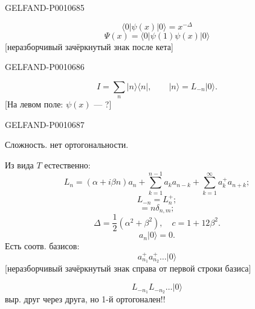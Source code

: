\begin{GelfandAdjacentEvidence}{GELFAND-P001068}{5}

\begin{equation*}
\langle0|\psi(x)|0\rangle=x^{-\Delta}
\end{equation*}
\begin{equation*}
\Psi(x)=\langle0|\psi(1)\psi(x)|0\rangle
\end{equation*}
[неразборчивый зачёркнутый знак после кета]
\end{GelfandAdjacentEvidence}
\begin{GelfandAdjacentEvidence}{GELFAND-P001068}{6}

\begin{equation*}
I=\sum_n|n\rangle\langle n|,\qquad |n\rangle=L_{-n}|0\rangle.
\end{equation*}
[На левом поле: $\psi(x)$ — ?]
\end{GelfandAdjacentEvidence}
\begin{GelfandAdjacentEvidence}{GELFAND-P001068}{7}


Сложность. нет ортогональности.

Из вида $T$ естественно:
\begin{equation*}
L_n=(\alpha+i\beta n)a_n+\sum_{k=1}^{n-1}a_ka_{n-k}+\sum_{k=1}^{\infty}a_k^+a_{n+k};
\end{equation*}
\begin{equation*}
L_{-n}=L_n^+;
\end{equation*}
\begin{equation*}
[a_n,a_m^+]=n\delta_{n,m};
\end{equation*}
\begin{equation*}
\Delta=\frac12(\alpha^2+\beta^2),\quad c=1+12\beta^2.
\end{equation*}
\begin{equation*}
a_n|0\rangle=0.
\end{equation*}
Есть соотв. базисов:
\begin{equation*}
a_{n_1}^+a_{n_2}^+\ldots|0\rangle
\end{equation*}
[неразборчивый зачёркнутый знак справа от первой строки базиса]
\end{GelfandAdjacentEvidence}

\begin{equation*}
L_{-n_1}L_{-n_2}\ldots|0\rangle
\end{equation*}
выр. друг через друга, но 1-й ортогонален!!

